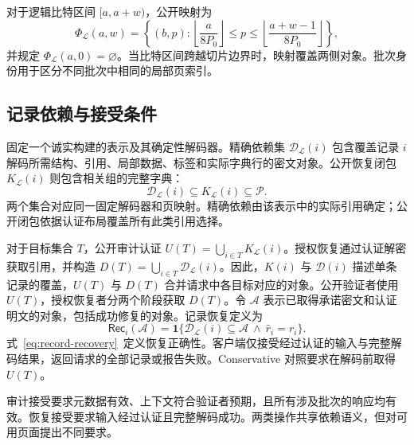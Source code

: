 \documentclass[10pt,journal]{IEEEtran}
\begin{document}
对于逻辑比特区间 $[a,a+w)$，公开映射为
\begin{equation}\label{eq:phi}
\Phi_{\mathcal L}(a,w)=
\left\{(b,p):\left\lfloor\frac{a}{8P_0}\right\rfloor
\leq p\leq\left\lfloor\frac{a+w-1}{8P_0}\right\rfloor\right\},
\end{equation}
并规定 $\Phi_{\mathcal L}(a,0)=\varnothing$。当比特区间跨越切片边界时，映射覆盖两侧对象。批次身份用于区分不同批次中相同的局部页索引。

\subsection{记录依赖与接受条件}
固定一个诚实构建的表示及其确定性解码器。精确依赖集 $\mathcal D_{\mathcal L}(i)$ 包含覆盖记录 $i$ 解码所需结构、引用、局部数据、标签和实际字典行的密文对象。公开恢复闭包 $K_{\mathcal L}(i)$ 则包含相关组的完整字典：
\begin{equation}\label{eq:sufficient-set}
\mathcal D_{\mathcal L}(i)\subseteq K_{\mathcal L}(i)\subseteq\mathcal P.
\end{equation}
两个集合对应同一固定解码器和页映射。精确依赖由该表示中的实际引用确定；公开闭包依据认证布局覆盖所有此类引用选择。

对于目标集合 $T$，公开审计认证 $U(T)=\bigcup_{i\in T}K_{\mathcal L}(i)$。授权恢复通过认证解密获取引用，并构造 $D(T)=\bigcup_{i\in T}\mathcal D_{\mathcal L}(i)$。因此，$K(i)$ 与 $\mathcal D(i)$ 描述单条记录的覆盖，$U(T)$ 与 $D(T)$ 合并请求中各目标对应的对象。公开验证者使用 $U(T)$，授权恢复者分两个阶段获取 $D(T)$。令 $\mathcal A$ 表示已取得承诺密文和认证明文的对象，包括成功修复的对象。记录恢复定义为
\begin{equation}\label{eq:record-recovery}
\mathsf{Rec}_i(\mathcal A)=
\mathbf1\{\mathcal D_{\mathcal L}(i)\subseteq\mathcal A
\ \land\ \widehat r_i=r_i\}.
\end{equation}
式~\eqref{eq:record-recovery}~定义恢复正确性。客户端仅接受经过认证的输入与完整解码结果，返回请求的全部记录或报告失败。Conservative 对照要求在解码前取得 $U(T)$。

审计接受要求元数据有效、上下文符合验证者预期，且所有涉及批次的响应均有效。恢复接受要求输入经过认证且完整解码成功。两类操作共享依赖语义，但对可用页面提出不同要求。
\end{document}
